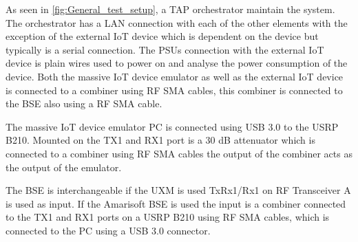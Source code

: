 As seen in \autoref{fig:General_test_setup}, a \gls{TAP} orchestrator maintain the system. The orchestrator has a \gls{LAN} connection with each of the other elements with the exception of the external IoT device which is dependent on the device but typically is a serial connection. The \gls{PSU}s connection with the external IoT device is plain wires used to power on and analyse the power consumption of the device. Both the massive IoT device emulator as well as the external IoT device is connected to a combiner using RF SMA cables, this combiner is connected to the \gls{BSE} also using a RF SMA cable. 

The massive IoT device emulator PC is connected using USB 3.0 to the USRP B210. Mounted on the TX1 and RX1 port is a 30 dB attenuator which is connected to a combiner using RF SMA cables the output of the combiner acts as the output of the emulator.

The \gls{BSE} is interchangeable if the UXM is used TxRx1/Rx1 on RF Transceiver A is used as input. If the Amarisoft BSE is used the input is a combiner connected to the TX1 and RX1 ports on a USRP B210 using RF SMA cables, which is connected to the PC using a USB 3.0 connector.



